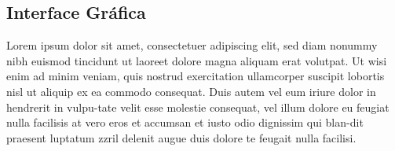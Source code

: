 \subsection{Interface Gráfica}
\label{secao:interface_grafica}
Lorem ipsum dolor sit amet, consectetuer adipiscing elit, sed diam nonummy nibh euismod tincidunt ut laoreet dolore magna aliquam erat volutpat. Ut wisi enim ad minim veniam, quis nostrud exercitation ullamcorper suscipit lobortis nisl ut aliquip ex ea commodo consequat. Duis autem vel eum iriure dolor in hendrerit in vulpu-tate velit esse molestie consequat, vel illum dolore eu feugiat nulla facilisis at vero eros et accumsan et iusto odio dignissim qui blan-dit praesent luptatum zzril delenit augue duis dolore te feugait nulla facilisi.